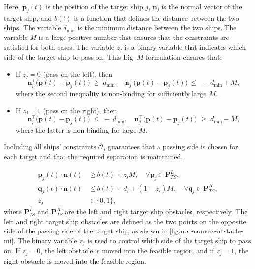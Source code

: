 Here, $\mathbf{p}_j(t)$ is the position of the target ship $j$, $\mathbf{n}_j$ is the normal vector of the target ship, and $b(t)$ is a function that defines the distance between the two ships. The variable $d_{\min}$ is the minimum distance between the two ships. The variable $M$ is a large positive number that ensures that the constraints are satisfied for both cases. The variable $z_j$ is a binary variable that indicates which side of the target ship to pass on.
This Big–$M$ formulation ensures that:

\begin{itemize}
    \item If $z_j = 0$ (pass on the left), then
    $$
        \mathbf{n}_j^\top\bigl(\mathbf{p}(t)-\mathbf{p}_j(t)\bigr)
        \;\ge\; d_{\min},
        \quad
        \mathbf{n}_j^\top\bigl(\mathbf{p}(t)-\mathbf{p}_j(t)\bigr)
        \;\le\; -\,d_{\min} + M,
    $$
    where the second inequality is non-binding for sufficiently large $M$.
    \item If $z_j = 1$ (pass on the right), then
    $$
        \mathbf{n}_j^\top\bigl(\mathbf{p}(t)-\mathbf{p}_j(t)\bigr)
        \;\le\; -\,d_{\min},
        \quad
        \mathbf{n}_j^\top\bigl(\mathbf{p}(t)-\mathbf{p}_j(t)\bigr)
        \;\ge\; d_{\min} - M,
    $$
    where the latter is non-binding for large $M$.
\end{itemize}
    
Including all ships’ constraints $\mathcal{O}_j$ guarantees that a passing side is chosen for each target and that the required separation is maintained.
    


\begin{subequations}\label{eq:colregs-constraints}
    \begin{align}
        \mathbf p_{j}(t) \cdot{\mathbf n}(t) &\ge b(t) + z_j M, \quad\forall \mathbf p_j\in\mathbf P_{TS}^L, \label{eq:colregs-left} \\
        \mathbf q_{j}(t) \cdot{\mathbf n}(t) &\le b(t) + d_{j} + (1 - z_j) M, \quad\forall \mathbf q_j\in\mathbf P_{TS}^R, \label{eq:colregs-right} \\
        z_j &\in \{0,1\}, \label{eq:colregs-binary}
    \end{align}
\end{subequations}
where $\mathbf P_{TS}^L$ and $\mathbf P_{TS}^R$ are the left and right target ship obstacles, respectively. The left and right target ship obstacles are defined as the two points on the opposite side of the passing side of the target ship, as shown in \cref{fig:non-convex-obstacle-mi}. The binary variable $z_j$ is used to control which side of the target ship to pass on. If $z_j = 0$, the left obstacle is moved into the feasible region, and if $z_j = 1$, the right obstacle is moved into the feasible region.

